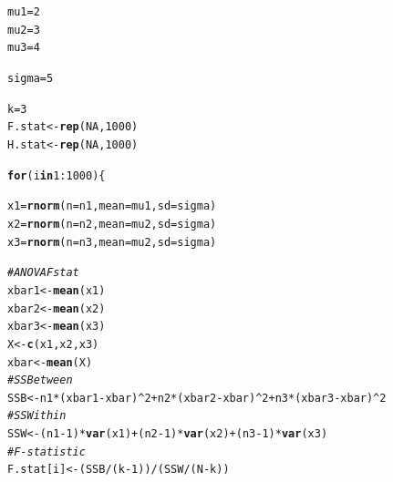 \documentclass{article}\usepackage[]{graphicx}\usepackage[]{xcolor}
\makeatletter
\newcommand{\hlnum}[1]{\textcolor[rgb]{0.686,0.059,0.569}{#1}}%
\newcommand{\hlcom}[1]{\textcolor[rgb]{0.678,0.584,0.686}{\textit{#1}}}%
\newcommand{\hlopt}[1]{\textcolor[rgb]{0,0,0}{#1}}%
\newcommand{\hldef}[1]{\textcolor[rgb]{0.345,0.345,0.345}{#1}}%
\newcommand{\hlkwa}[1]{\textcolor[rgb]{0.161,0.373,0.58}{\textbf{#1}}}%
\newcommand{\hlkwb}[1]{\textcolor[rgb]{0.69,0.353,0.396}{#1}}%
\newcommand{\hlkwc}[1]{\textcolor[rgb]{0.333,0.667,0.333}{#1}}%
\newcommand{\hlkwd}[1]{\textcolor[rgb]{0.737,0.353,0.396}{\textbf{#1}}}%
\newenvironment{kframe}{%
 \def\at@end@of@kframe{}%
 \ifinner\ifhmode%
  \def\at@end@of@kframe{\end{minipage}}%
  \begin{minipage}{\columnwidth}%
 \fi\fi%
 \def\FrameCommand##1{\hskip\@totalleftmargin \hskip-\fboxsep
 \colorbox{shadecolor}{##1}\hskip-\fboxsep
     \hskip-\linewidth \hskip-\@totalleftmargin \hskip\columnwidth}%
 \MakeFramed {\advance\hsize-\width
   \@totalleftmargin\z@ \linewidth\hsize
   \@setminipage}}%
 {\par\unskip\endMakeFramed%
 \at@end@of@kframe}
\newenvironment{knitrout}{}{} %
\makeatother
\begin{document}
\begin{enumerate}
\begin{knitrout}
\begin{kframe}
\begin{alltt}
\hldef{mu1} \hlkwb{=} \hlnum{2}
\hldef{mu2} \hlkwb{=} \hlnum{3}
\hldef{mu3} \hlkwb{=} \hlnum{4}

\hldef{sigma} \hlkwb{=} \hlnum{5}

\hldef{k} \hlkwb{=} \hlnum{3}
\hldef{F.stat} \hlkwb{<-} \hlkwd{rep}\hldef{(}\hlnum{NA}\hldef{,} \hlnum{1000}\hldef{)}
\hldef{H.stat} \hlkwb{<-} \hlkwd{rep}\hldef{(}\hlnum{NA}\hldef{,} \hlnum{1000}\hldef{)}

\hlkwa{for} \hldef{(i} \hlkwa{in} \hlnum{1}\hlopt{:}\hlnum{1000}\hldef{)\{}

  \hldef{x1} \hlkwb{=} \hlkwd{rnorm}\hldef{(}\hlkwc{n} \hldef{= n1,} \hlkwc{mean} \hldef{= mu1,} \hlkwc{sd} \hldef{= sigma)}
  \hldef{x2} \hlkwb{=} \hlkwd{rnorm}\hldef{(}\hlkwc{n} \hldef{= n2,} \hlkwc{mean} \hldef{= mu2,} \hlkwc{sd} \hldef{= sigma)}
  \hldef{x3} \hlkwb{=} \hlkwd{rnorm}\hldef{(}\hlkwc{n} \hldef{= n3,} \hlkwc{mean} \hldef{= mu2,} \hlkwc{sd} \hldef{= sigma)}

  \hlcom{# ANOVA F stat}
  \hldef{xbar1} \hlkwb{<-} \hlkwd{mean}\hldef{(x1)}
  \hldef{xbar2} \hlkwb{<-} \hlkwd{mean}\hldef{(x2)}
  \hldef{xbar3} \hlkwb{<-} \hlkwd{mean}\hldef{(x3)}
  \hldef{X} \hlkwb{<-} \hlkwd{c}\hldef{(x1, x2, x3)}
  \hldef{xbar} \hlkwb{<-} \hlkwd{mean}\hldef{(X)}
  \hlcom{# SSBetween}
  \hldef{SSB} \hlkwb{<-} \hldef{n1}\hlopt{*}\hldef{(xbar1}\hlopt{-}\hldef{xbar)}\hlopt{^}\hlnum{2} \hlopt{+} \hldef{n2}\hlopt{*}\hldef{(xbar2}\hlopt{-}\hldef{xbar)}\hlopt{^}\hlnum{2} \hlopt{+} \hldef{n3}\hlopt{*}\hldef{(xbar3}\hlopt{-}\hldef{xbar)}\hlopt{^}\hlnum{2}
  \hlcom{# SSWithin}
  \hldef{SSW} \hlkwb{<-} \hldef{(n1}\hlopt{-}\hlnum{1}\hldef{)}\hlopt{*}\hlkwd{var}\hldef{(x1)} \hlopt{+} \hldef{(n2}\hlopt{-}\hlnum{1}\hldef{)}\hlopt{*}\hlkwd{var}\hldef{(x2)} \hlopt{+} \hldef{(n3}\hlopt{-}\hlnum{1}\hldef{)}\hlopt{*}\hlkwd{var}\hldef{(x3)}
  \hlcom{# F-statistic}
  \hldef{F.stat[i]} \hlkwb{<-} \hldef{(SSB}\hlopt{/}\hldef{(k}\hlopt{-}\hlnum{1}\hldef{))}\hlopt{/}\hldef{(SSW}\hlopt{/}\hldef{(N}\hlopt{-}\hldef{k))}


\end{alltt}
\end{kframe}
\end{knitrout}
\end{enumerate}
\end{document}
